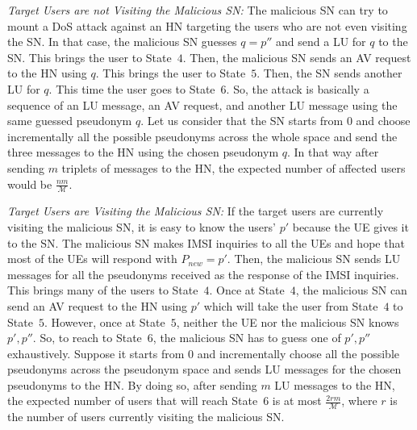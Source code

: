 \documentclass{llncs} %
\begin{document}
\textit{Target Users are not Visiting the Malicious SN:} The malicious SN can try to mount a DoS attack against an HN targeting the users who are not even visiting the SN. In that case, the malicious SN guesses $q=p''$ and send a LU for $q$ to the SN. This brings the user to State~$4$. Then, the malicious SN sends an AV request to the HN using $q$. This brings the user to State~$5$. Then, the SN sends another LU for $q$. This time the user goes to State~$6$. So, the attack is basically a sequence of an LU message, an AV request, and another LU message using the same guessed pseudonym $q$. Let us consider that the SN starts from $0$ and choose incrementally all the possible pseudonyms across the whole space and send the three messages to the HN using the chosen pseudonym $q$. In that way after sending $m$ triplets of messages to the HN, the expected number of affected users would be $\frac{nm}{\mathcal{M}}$. %

\textit{Target Users are Visiting the Malicious SN:} If the target users are currently visiting the malicious SN, it is easy to know the users' $p'$ because the UE gives it to the SN. The malicious SN makes IMSI inquiries to all the UEs and hope that most of the UEs will respond with $P_{new} = p'$. Then, the malicious SN sends LU messages for all the pseudonyms received as the response of the IMSI inquiries. This brings many of the users to State~$4$.  Once at State~$4$, the malicious SN can send an AV request to the HN using $p'$ which will take the user from State~$4$ to State~$5$. However, once at State~$5$, neither the UE nor the malicious SN knows $p',p''$. So, to reach to State~$6$, the malicious SN has to guess one of $p',p''$ exhaustively. Suppose it starts from $0$ and incrementally choose all the possible pseudonyms across the pseudonym space and sends LU messages for the chosen pseudonyms to the HN. By doing so, after sending $m$ LU messages to the HN, the expected number of users that will reach State~$6$ is at most $\frac{2rm}{\mathcal{M}}$, where $r$ is the number of users currently visiting the malicious SN. %
\end{document}
